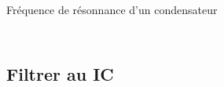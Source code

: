 \begin{frame}{Fréquence de résonnance d'un condensateur}
\begin{columns}
\begin{column}{0.5\textwidth}
\begin{figure}
            \end{figure}
        \end{column}
    \end{columns}
\end{frame}


\subsection{Filtrer au IC}
